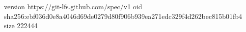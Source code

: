 version https://git-lfs.github.com/spec/v1
oid sha256:ebf036d0e8a4046d69de0279d80f906b939ea271edc329f4d262bec815b01fb4
size 222444
